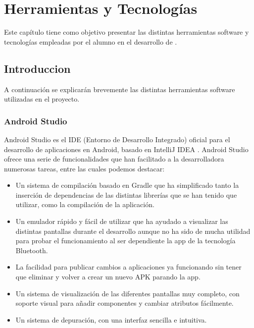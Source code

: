%
%
%

\cleardoublepage
\chapter{Herramientas y Tecnologías} \label{chap:Tecnologias} 

Este capítulo tiene como objetivo presentar las distintas herramientas software y tecnologías empleadas por el alumno en el desarrollo de \ULLNavigation{}.

\section{Introduccion}

A continuación se explicarán brevemente las distintas herramientas software utilizadas en el proyecto. 

\subsection{Android Studio}

Android Studio \cite{URL::AndroidStudio} es el IDE (Entorno de Desarrollo Integrado) oficial para el desarrollo de aplicaciones en Android, basado en IntelliJ IDEA \cite{URL::IntelliJIDEA}. Android Studio ofrece una serie de funcionalidades que han facilitado a la desarrolladora numerosas tareas, entre las cuales podemos destacar:


\begin{itemize}
\item Un sistema de compilación basado en Gradle\cite{URL::Gradle} que ha simplificado tanto la inserción de dependencias de las distintas librerías que se han tenido que utilizar, como la compilación de la aplicación.
\item Un emulador rápido y fácil de utilizar que ha ayudado a visualizar las distintas pantallas durante el desarrollo aunque no ha sido de mucha utilidad para probar el funcionamiento al ser dependiente la app de la tecnología Bluetooth.
\item La facilidad para publicar cambios a aplicaciones ya funcionando sin tener que eliminar y volver a crear un nuevo APK parando la app.
\item Un sistema de visualización de las diferentes pantallas muy completo, con soporte visual para añadir componentes y cambiar atributos fácilmente.
\item Un sistema de depuración, con una interfaz sencilla e intuitiva.
\end{itemize} 

